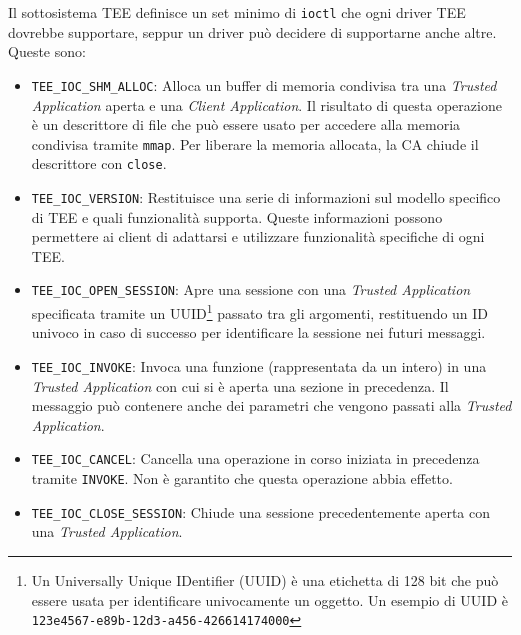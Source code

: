 \documentclass[12pt,italian]{report}
\begin{document}
Il sottosistema TEE definisce un set minimo di \texttt{ioctl} che ogni
driver TEE dovrebbe supportare, seppur un driver può decidere di
supportarne anche altre.
Queste sono:
\begin{itemize}
    \item \texttt{TEE\_IOC\_SHM\_ALLOC}:
        Alloca un buffer di memoria condivisa tra una
        \textit{Trusted Application} aperta e una
        \textit{Client Application}.
        Il risultato di questa operazione è un descrittore
        di file che può essere usato per accedere alla memoria condivisa
        tramite \texttt{mmap}.
        Per liberare la memoria allocata, la CA chiude il descrittore con
        \texttt{close}. 

    \item \texttt{TEE\_IOC\_VERSION}:
        Restituisce una serie di informazioni sul modello specifico di TEE e
        quali funzionalità supporta.
        Queste informazioni possono permettere ai client di adattarsi e
        utilizzare funzionalità specifiche di ogni TEE.

    \item \texttt{TEE\_IOC\_OPEN\_SESSION}:
        Apre una sessione con una \textit{Trusted Application} specificata
        tramite un UUID\footnote{
            Un Universally Unique IDentifier (UUID) è una etichetta di 128 bit
            che può essere usata per identificare univocamente un oggetto.
            Un esempio di UUID è \texttt{123e4567-e89b-12d3-a456-426614174000}
        } passato tra gli argomenti, restituendo
        un ID univoco in caso di successo per identificare la sessione nei
        futuri messaggi.

    \item \texttt{TEE\_IOC\_INVOKE}:
        Invoca una funzione (rappresentata da un intero) in una
        \textit{Trusted Application} con cui si è aperta una sezione
        in precedenza.
        Il messaggio può contenere anche dei parametri che vengono passati
        alla \textit{Trusted Application}.

    \item \texttt{TEE\_IOC\_CANCEL}:
        Cancella una operazione in corso iniziata in precedenza tramite
        \texttt{INVOKE}.
        Non è garantito che questa operazione abbia effetto.

    \item \texttt{TEE\_IOC\_CLOSE\_SESSION}:
        Chiude una sessione precedentemente aperta con una
        \textit{Trusted Application}.
\end{itemize}
\end{document}
